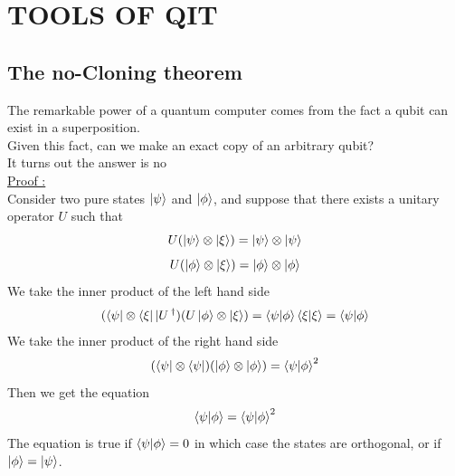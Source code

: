 \documentclass[12pt,oneside]{book}
\begin{document}
    

\chapter{TOOLS OF QIT}
\section{The no-Cloning theorem}
The remarkable power of a quantum computer comes from the fact a qubit can exist in a superposition.\\
Given this fact, can we make an exact copy of an arbitrary qubit?\\
It turns out the answer is no\\
\underline{Proof :}\\
Consider two pure states $\ket{\psi}$ and $\ket{\phi}$, and suppose that there exists a unitary operator $U$ such that 
\[ U(\ket{\psi}\otimes\ket{\xi}) = \ket{\psi} \otimes\ket{\psi} \]
\[ U(\ket{\phi}\otimes\ket{\xi}) = \ket{\phi} \otimes\ket{\phi} \]
We take  the inner product of the left hand side 
\[ (\bra{\psi}\otimes\bra{\xi}|U\operatorname{^\dagger})(U\ket{\phi}\otimes\ket{\xi}) = \braket{\psi|\phi}\braket{\xi|\xi} = \braket{\psi|\phi} \]
We take the inner product of the right hand side 
\[ (\bra{\psi}\otimes\bra{\psi})(\ket{\phi}\otimes\ket{\phi}) = \braket{\psi|\phi}^2 \]
Then we get the equation 
\[ \braket{\psi|\phi} = \braket{\psi|\phi}^2 \] 
The equation is true if $\braket{\psi|\phi} = 0$ in which case the states are orthogonal, or if $\ket{\phi} = \ket{\psi}$.
\begin{center}\end{center}
\end{document}

